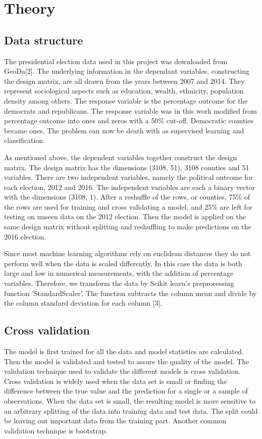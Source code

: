 \section{Theory}
	\subsection{Data structure}
The presidential election data used in this project was downloaded from GeoDa[2]. The underlying information in the dependant variables, constructing the design matrix, are all drawn from the years between 2007 and 2014. They represent sociological aspects such as education, wealth, ethnicity, population density among others. The response variable is the percentage outcome for the democrats and republicans. The response variable was in this work modified from percentage outcome into ones and zeros with a 50\% cut-off. Democratic counties became ones. The problem can now be death with as supervised learning and classification.
\\
\par  
As mentioned above, the dependent variables together construct the design matrix. The design matrix has the dimensions (3108, 51), 3108 counties and 51 variables. There are two independent variables, namely the political outcome for each election, 2012 and 2016. The independent variables are each a binary vector with the dimensions (3108, 1). After a reshuffle of the rows, or counties, 75\% of the rows are used for training and cross validating a model, and 25\% are left for testing on unseen data on the 2012 election. Then the model is applied on the same design matrix without splitting and reshuffling to make predictions on the 2016 election.
\\
\par
Since most machine learning algorithms rely on euclidean distances they do not perform well when the data is scaled differently. In this case the data is both large and low in numerical measurements, with the addition of percentage variables. Therefore, we transform the data by Scikit learn's preprocessing function 'StandardScaler'. The function subtracts the column mean and divide by the column standard deviation for each column [3]. 
\\
\par
	\subsection{Cross validation}
The model is first trained for all the data and model statistics are calculated. Then the model is validated and tested to assure the quality of the model. The validation technique used to validate the different models is cross validation. Cross validation is widely used when the data set is small or finding the difference between the true value and the prediction for a single or a sample of observations. When the data set is small, the resulting model is more sensitive to an arbitrary splitting of the data into training data and test data. The split could be leaving out important data from the training part. Another common validation technique is bootstrap. 
\\
\par

